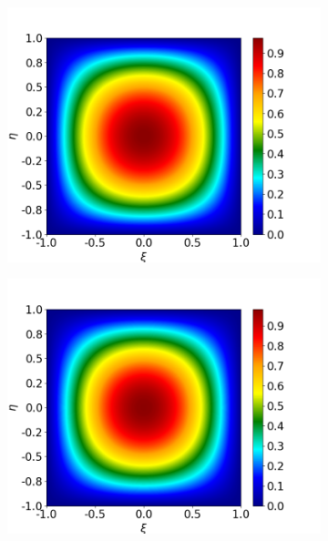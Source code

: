 \documentclass[preprint,12pt]{elsarticle}
\begin{document}
\begin{figure}
	\centering
	\begin{subfigure}[b]{0.49\textwidth}
		\centering
		\includegraphics[width=\textwidth]{figs/iso0.png}
		\caption[]%
		{{\small }}    
		\label{fig:iso0}
	\end{subfigure}
	\hfill
	\begin{subfigure}[b]{0.49\textwidth}  
		\centering 
		\includegraphics[width=\textwidth]{figs/iso1.png}
		\caption[]%
		{{\small }}    
		\label{fig:iso1}
	\end{subfigure}
	\vfill
	\begin{subfigure}[b]{0.49\textwidth}   

\end{subfigure}
\end{figure}
\end{document}
